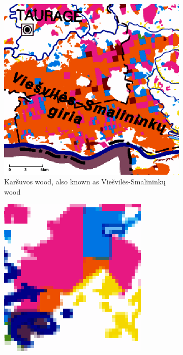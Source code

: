 \documentclass[a4paper,12pt]{scrbook}
\begin{document}
\begin{figure}
  \centering
  \begin{subfigure}[b]{0.48\textwidth}
    \includegraphics[width=\textwidth]{thesis-figures/karsuva-atlas}
    \caption{Kar\v{s}uvos wood, also known as Vie\v{s}vil\.{e}s-Smalinink\k{u} wood}
  \end{subfigure} \hfill
  \begin{subfigure}[b]{0.48\textwidth}
    \includegraphics[width=\textwidth]{thesis-figures/medziokalnis-atlas}

\end{subfigure}
\end{figure}
\end{document}

